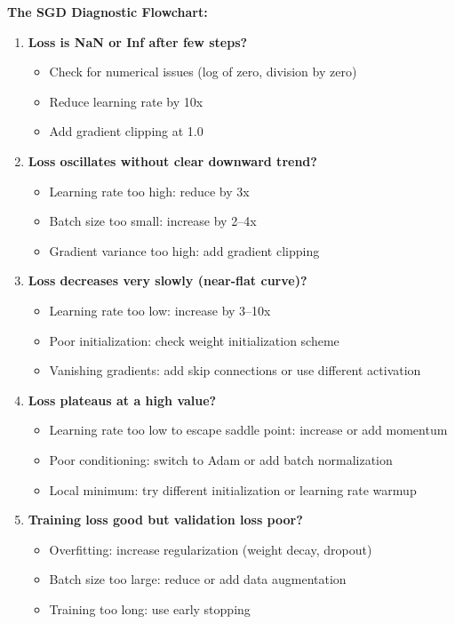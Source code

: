 \documentclass[../../main.tex]{subfiles}
\begin{document}
\begin{principle}
\textbf{The SGD Diagnostic Flowchart:}

\begin{enumerate}
    \item \textbf{Loss is NaN or Inf after few steps?}
    \begin{itemize}
        \item Check for numerical issues (log of zero, division by zero)
        \item Reduce learning rate by 10x
        \item Add gradient clipping at 1.0
    \end{itemize}

    \item \textbf{Loss oscillates without clear downward trend?}
    \begin{itemize}
        \item Learning rate too high: reduce by 3x
        \item Batch size too small: increase by 2--4x
        \item Gradient variance too high: add gradient clipping
    \end{itemize}

    \item \textbf{Loss decreases very slowly (near-flat curve)?}
    \begin{itemize}
        \item Learning rate too low: increase by 3--10x
        \item Poor initialization: check weight initialization scheme
        \item Vanishing gradients: add skip connections or use different activation
    \end{itemize}

    \item \textbf{Loss plateaus at a high value?}
    \begin{itemize}
        \item Learning rate too low to escape saddle point: increase or add momentum
        \item Poor conditioning: switch to Adam or add batch normalization
        \item Local minimum: try different initialization or learning rate warmup
    \end{itemize}

    \item \textbf{Training loss good but validation loss poor?}
    \begin{itemize}
        \item Overfitting: increase regularization (weight decay, dropout)
        \item Batch size too large: reduce or add data augmentation
        \item Training too long: use early stopping
    \end{itemize}
\end{enumerate}
\end{principle}
\end{document}
